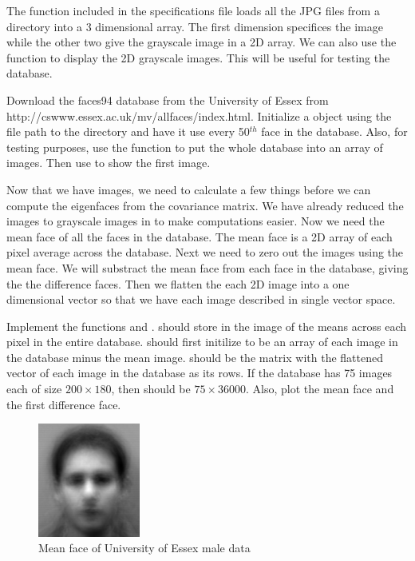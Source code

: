 The function  included in the specifications file loads all the JPG files from a directory into a 3 dimensional array. 
The first dimension specifices the image while the other two give the grayscale image in a 2D array.
We can also use the function  to display the 2D grayscale images.
This will be useful for testing the database.

\begin{problem}
Download the faces94 database from the University of Essex from http://cswww.essex.ac.uk/mv/allfaces/index.html.
Initialize a  object using the file path to the directory and have it use every 50$^{th}$ face in the database.
Also, for testing purposes, use the function  to put the whole database into an array of images.
Then use  to show the first image.
\end{problem}

Now that we have images, we need to calculate a few things before we can compute the eigenfaces from the covariance matrix.
We have already reduced the images to grayscale images in  to make computations easier.
Now we need the mean face of all the faces in the database. The mean face is a 2D array of each pixel average across the database.
Next we need to zero out the images using the mean face. 
We will substract the mean face from each face in the database, giving the the difference faces.
Then we flatten the each 2D image into a one dimensional vector so that we have each image described in single vector space.

\begin{problem}
Implement the functions  and .
 should store in  the image of the means across each pixel in the entire database.
 should first initilize  to be an array of each image in the database minus the mean image.
 should be the matrix with the flattened vector of each image in the database as its rows.
If the database has 75 images each of size $200 \times 180$, then  should be $75 \times 36000$.
Also, plot the mean face and the first difference face.
\end{problem}

\begin{figure}
\includegraphics[width=0.3\textwidth]{meanFace.png}
\caption{Mean face of University of Essex male data}
\label{facialRecognition:meanFace}
\end{figure}

